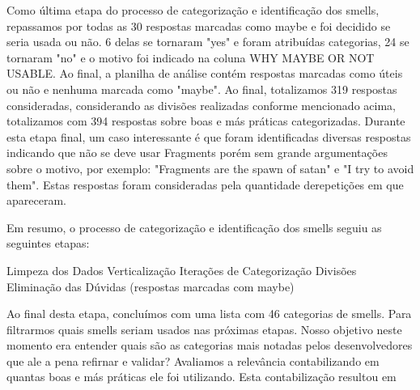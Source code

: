 Como \'ultima etapa do processo de categoriza\c{c}\~ao e identifica\c{c}\~ao dos smells, repassamos por todas as 30 respostas marcadas como maybe e foi decidido se seria usada ou n\~ao. 6 delas se tornaram "yes" e foram atribu\'idas categorias, 24 se tornaram "no" e o motivo foi indicado na coluna WHY MAYBE OR NOT USABLE. Ao final, a planilha de an\'alise cont\'em respostas marcadas como \'uteis ou n\~ao e nenhuma marcada como "maybe". Ao final, totalizamos 319 respostas consideradas, considerando as divis\~oes realizadas conforme mencionado acima, totalizamos com 394 respostas sobre boas e m\'as pr\'aticas categorizadas. Durante esta etapa final, um caso interessante \'e que foram identificadas diversas respostas indicando que n\~ao se deve usar Fragments por\'em sem grande argumenta\c{c}\~oes sobre o motivo, por exemplo: "Fragments are the spawn of satan" e "I try to avoid them". Estas respostas foram consideradas pela quantidade derepeti\c{c}\~oes em que apareceram.

Em resumo, o processo de categoriza\c{c}\~ao e identifica\c{c}\~ao dos smells seguiu as seguintes etapas:

Limpeza dos Dados \textrightarrow Verticaliza\c{c}\~ao \textrightarrow Itera\c{c}\~oes de Categoriza\c{c}\~ao \textrightarrow Divis\~oes \textrightarrow Elimina\c{c}\~ao das D\'uvidas (respostas marcadas com maybe)

Ao final desta etapa, conclu\'imos com uma lista com 46 categorias de smells. Para filtrarmos quais smells seriam usados nas pr\'oximas etapas. Nosso objetivo neste momento era entender quais s\~ao as categorias mais notadas pelos desenvolvedores que ale a pena refirnar e validar? Avaliamos a relev\^ancia contabilizando em quantas boas e m\'as pr\'aticas ele foi utilizando. Esta contabiliza\c{c}\~ao resultou em